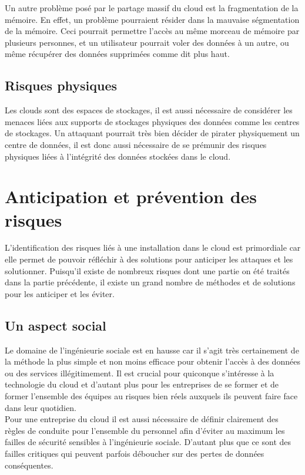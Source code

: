 \documentclass[a4paper, 12pt]{article}
\begin{document}
      Un autre problème posé par le partage massif du cloud est la fragmentation
      de la mémoire. En effet, un problème pourraient résider dans la mauvaise
      ségmentation de la mémoire. Ceci pourrait permettre l'accès au même
      morceau de mémoire par plusieurs personnes, et un utilisateur pourrait
      voler des données à un autre, ou même récupérer des données supprimées
      comme dit plus haut.

    \subsection{Risques physiques}
      Les clouds sont des espaces de stockages, il est aussi nécessaire de
      considérer les menaces liées aux supports de stockages physiques des
      données comme les centres de stockages. Un attaquant pourrait très bien
      décider de pirater physiquement un centre de données, il est donc aussi
      nécessaire de se prémunir des risques physiques liées à l'intégrité des
      données stockées dans le cloud.

  \section{Anticipation et prévention des risques}
      L'identification des risques liés à une installation dans le cloud est
      primordiale car elle permet de pouvoir réfléchir à des solutions pour
      anticiper les attaques et les solutionner. Puisqu'il existe de nombreux
      risques dont une partie on été traités dans la partie précédente, il
      existe un grand nombre de méthodes et de solutions pour les anticiper
      et les éviter.

      \subsection{Un aspect social}
      Le domaine de l'ingénieurie sociale est en hausse car il s'agit très
      certainement de la méthode la plus simple et non moins efficace pour
      obtenir l'accès à des données ou des services illégitimement. Il est
      crucial pour quiconque s'intéresse à la technologie du cloud et d'autant
      plus pour les entreprises de se former et de former l'ensemble des
      équipes au risques bien réels auxquels ils peuvent faire face dans leur
      quotidien. \\

      Pour une entreprise du cloud il est aussi nécessaire de définir
      clairement des règles de conduite pour l'ensemble du personnel afin
      d'éviter au maximum les failles de sécurité sensibles à l'ingénieurie
      sociale. D'autant plus que ce sont des failles critiques qui peuvent
      parfois déboucher sur des pertes de données conséquentes. \\
\end{document}

